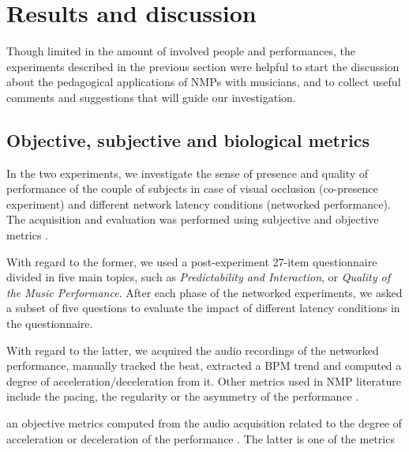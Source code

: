 \section{Results and discussion}\label{sec:discussion}
Though limited in the amount of involved people and performances, the experiments described in the previous section were helpful to start the discussion about the pedagogical applications of NMPs with musicians, and to collect useful comments and suggestions that will guide our investigation. 

\subsection{Objective, subjective and biological metrics}
In the two experiments, we investigate the sense of presence and quality of performance of the couple of subjects in case of visual occlusion (co-presence experiment) and different network latency conditions (networked performance). The acquisition and evaluation was performed using subjective and objective metrics \cite{CIM2018}. 

With regard to the former, we used a post-experiment 27-item questionnaire divided in five main topics, such as \textit{Predictability and Interaction}, or \textit{Quality of the Music Performance}. After each phase of the networked experiments, we asked a subset of five questions to evaluate the impact of different latency conditions in the questionnaire.

With regard to the latter, we acquired the audio recordings of the networked performance, manually tracked the beat, extracted a BPM trend and computed a degree of acceleration/deceleration from it. Other metrics used in NMP literature include the pacing, the regularity or the asymmetry of the performance \cite{RottondiOverview}.



an objective metrics computed from the audio acquisition related to the degree of acceleration or deceleration of the performance . The latter is one of the metrics
 


